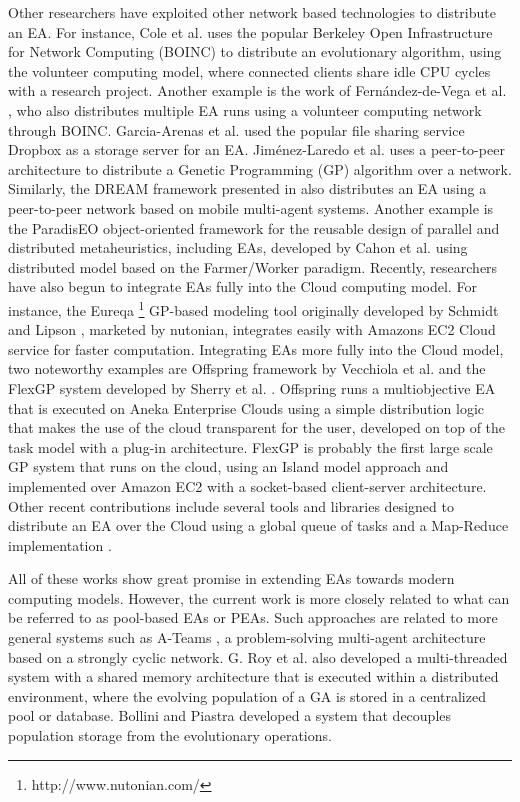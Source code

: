 Other researchers have exploited other network based technologies to distribute an EA.
For instance, Cole et al. \cite{MilkyWay} uses the popular Berkeley Open Infrastructure for Network Computing (BOINC) to distribute an evolutionary algorithm,
using the volunteer computing model, where connected clients share idle CPU cycles with a research project.
Another example is the work of Fern\'andez-de-Vega et al. \cite{nc}, who also distributes multiple EA runs using a volunteer computing network through BOINC.
Garcia-Arenas et al. \cite{garcia2011} used the popular file sharing service Dropbox as a storage server for an EA.
Jim\'enez-Laredo et al. \cite{garcia2011} uses a peer-to-peer architecture to distribute a Genetic Programming (GP) algorithm over a network.
Similarly, the DREAM framework presented in \cite{DREAM} also distributes an EA using a peer-to-peer network based on mobile multi-agent systems.
Another example is the ParadisEO object-oriented framework for the reusable design of parallel and distributed metaheuristics, including EAs, developed
by Cahon et al. \cite{ParadisEO} using distributed model based on the Farmer/Worker paradigm.
Recently, researchers have also begun to integrate EAs fully into the Cloud computing model.
For instance, the Eureqa \footnote{http://www.nutonian.com/} GP-based modeling tool originally developed by Schmidt and Lipson \cite{free-form}, marketed by nutonian,
integrates easily with Amazons EC2 Cloud service for faster computation.
Integrating EAs more fully into the Cloud model, two noteworthy examples are Offspring framework by Vecchiola et al. \cite{VecchiolaCORR}
and the FlexGP system developed by Sherry et al. \cite{FlexGP}.
Offspring runs a multiobjective EA that is executed on Aneka Enterprise Clouds using a simple distribution logic that makes the use of the cloud
transparent for the user, developed on top of the task model with a plug-in architecture.
FlexGP is probably the first large scale GP system that runs on the cloud, using an Island model approach and implemented over
Amazon EC2 with a socket-based client-server architecture.
Other recent contributions include several tools and libraries designed to distribute an EA over the Cloud using a global queue of tasks and a Map-Reduce
implementation \cite{FlexGP}.


All of these works show great promise in extending EAs towards modern computing models.
However, the current work is more closely related to what can be
referred to as pool-based EAs or PEAs. %
Such approaches are related to more general systems such as A-Teams \cite{ateam}, a problem-solving multi-agent architecture based on a strongly cyclic network.
G. Roy et al. \cite{roy:2009} also developed a multi-threaded system with a shared memory architecture that is executed within a distributed environment,
where the evolving population of a GA is stored in a centralized pool or database. Bollini and Piastra \cite{bollini:1999} developed a system that decouples population storage from the evolutionary operations.

